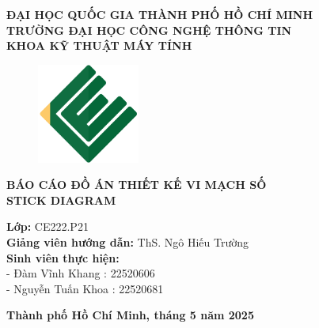\documentclass[a4paper,12pt]{article}
\begin{document}
\thispagestyle{empty}
\begin{center}
\textbf{\Large ĐẠI HỌC QUỐC GIA THÀNH PHỐ HỒ CHÍ MINH}\\
\textbf{\Large TRƯỜNG ĐẠI HỌC CÔNG NGHỆ THÔNG TIN}\\
\textbf{\Large KHOA KỸ THUẬT MÁY TÍNH}\\[1cm]

\begin{figure}[H]
    \centering
    \includegraphics[width=0.3\textwidth]{../PNG/CE.png}
    \label{fig:LOGO_CE}\\
\end{figure}

\vspace {1cm}

\textbf{\Large BÁO CÁO ĐỒ ÁN THIẾT KẾ VI MẠCH SỐ}\\[0.5cm]
\textbf{\Large STICK DIAGRAM}\\[5cm]

\begin{flushleft}

\textbf{Lớp:} CE222.P21\\
\textbf{Giảng viên hướng dẫn:} ThS. Ngô Hiếu Trường\\
\textbf{Sinh viên thực hiện:} \\
- Đàm Vĩnh Khang : 22520606 \\
- Nguyễn Tuấn Khoa : 22520681\\[3.5cm]

\end{flushleft}
\end{center}
\begin{center}
\textbf{Thành phố Hồ Chí Minh, tháng 5 năm 2025}
\end{center}
\newpage
\setcounter{page}{1}
\tableofcontents
\newpage


\end{document}
